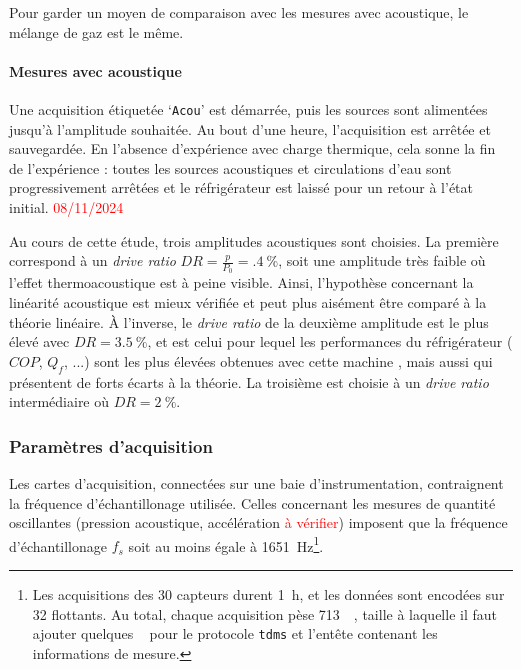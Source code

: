 Pour garder un moyen de comparaison avec les mesures avec acoustique, le mélange de gaz est le même.

\paragraph{Mesures avec acoustique}\label{chap:MesureAvecAcou} 
Une acquisition étiquetée `\texttt{Acou}' est démarrée, puis les sources sont alimentées jusqu'à l'amplitude souhaitée. Au bout d'une heure, l'acquisition est arrêtée et sauvegardée. En l'absence d'expérience avec charge thermique, cela sonne la fin de l'expérience : toutes les sources acoustiques et circulations d'eau sont progressivement arrêtées et le réfrigérateur est laissé pour un retour à l'état initial. \textcolor{red}{08/11/2024}

Au cours de cette étude, trois amplitudes acoustiques sont choisies. La première correspond à un \textit{drive ratio} $DR=\frac{p}{P_0}=\qty{.4}{\percent}$, soit une amplitude très faible où l'effet thermoacoustique est à peine visible. Ainsi, l'hypothèse concernant la linéarité acoustique est mieux vérifiée et peut plus aisément être comparé à la théorie linéaire. À l'inverse, le \textit{drive ratio} de la deuxième amplitude est le plus élevé avec $DR=\qty{3.5}{\percent}$, et est celui pour lequel les performances du réfrigérateur ($COP$, $Q_f$, ...) sont les plus élevées obtenues avec cette machine \cite{ramadan_design_2021}, mais aussi qui présentent de forts écarts à la théorie. La troisième est choisie à un \textit{drive ratio} intermédiaire où $DR=\qty{2}{\percent}$. 




\subsubsection{Paramètres d'acquisition}

Les cartes d'acquisition, connectées sur une baie d'instrumentation, contraignent la fréquence d'échantillonage utilisée. Celles concernant les mesures de quantité oscillantes (pression acoustique, accélération \textcolor{red}{à vérifier}) imposent que la fréquence d'échantillonage $f_s$ soit au moins égale à \qty{1651}{\Hz}\footnote{Les acquisitions des \num{30} capteurs durent \qty{1}{\hour}, et les données sont encodées sur \qty{32}{\bit} flottants. Au total, chaque acquisition pèse \qty{713}{\mega\byte}, taille à laquelle il faut ajouter quelques \unit{\mega\byte} pour le protocole \texttt{tdms} et l'entête contenant les informations de mesure.}.

